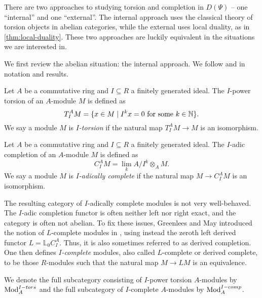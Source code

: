 There are two approaches to studying torsion and completion in $D(\Psi)$ -- one ``internal'' and one ``external''. The internal approach uses the classical theory of torsion objects in abelian categories, while the external uses local duality, as in \cref{thm:local-duality}. These two approaches are luckily equivalent in the situations we are interested in. 

We first review the abelian situation: the internal approach. We follow \cite{barthel-heard-valenzuela_2018} and \cite{barthel-heard-valenzuela_2020} in notation and results. 

\begin{definition}
    \label{def:I-power-torsion-module}
    Let $A$ be a commutative ring and $I\subseteq R$ a finitely generated ideal. The $I$-power torsion of an $A$-module $M$ is defined as
    $$T_I^A M = \{x\in M \mid I^k x = 0 \text{ for some } k\in \mathbb{N}\}.$$
    We say a module $M$ is \emph{$I$-torsion} if the natural map $T_I^A M\longrightarrow M$ is an isomorphism. 
\end{definition}

\begin{definition}
    Let $A$ be a commutative ring and $I\subseteq R$ a finitely generated ideal. The $I$-adic completion of an $A$-module $M$ is defined as
    $$C_I^A M = \lim_k A/I^k\otimes_A M.$$
    We say a module $M$ is \emph{$I$-adically complete} if the natural map $M\longrightarrow C_I^A M$ is an isomorphism. 
\end{definition}

\begin{remark}
    \label{rm:I-complete-vs-I-adically-complete}
    The resulting category of $I$-adically complete modules is not very well-behaved. The $I$-adic completion functor is often neither left nor right exact, and the category is often not abelian. To fix these issues, Greenlees and May introduced the notion of $L$-complete modules in \cite{greenlees-may_92}, using instead the zeroth left derived functor $L=\mathbb{L}_0 C_I^A$. Thus, it is also sometimes referred to as derived completion. One then defines \emph{$I$-complete} modules, also called $L$-complete or derived complete, to be those $R$-modules such that the natural map $M\longrightarrow L M$ is an equivalence. 
\end{remark}

\begin{notation}
    We denote the full subcategory consisting of $I$-power torsion $A$-modules by $\mathrm{Mod}_A^{I-tors}$ and the full subcategory of $I$-complete $A$-modules by $\mathrm{Mod}_A^{I-comp}$. 
\end{notation}

